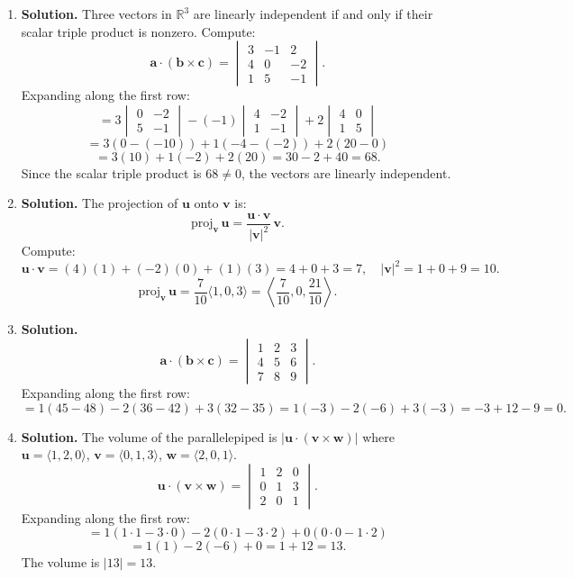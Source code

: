 \begin{enumerate}
\item \textbf{Solution.}
Three vectors in \( \mathbb{R}^3 \) are linearly independent if and only if their scalar triple product is nonzero. Compute:
\[
\mathbf{a} \cdot (\mathbf{b} \times \mathbf{c}) = \begin{vmatrix} 3 & -1 & 2 \\ 4 & 0 & -2 \\ 1 & 5 & -1 \end{vmatrix}.
\]
Expanding along the first row:
\[
= 3\begin{vmatrix} 0 & -2 \\ 5 & -1 \end{vmatrix} - (-1)\begin{vmatrix} 4 & -2 \\ 1 & -1 \end{vmatrix} + 2\begin{vmatrix} 4 & 0 \\ 1 & 5 \end{vmatrix}
\]
\[
= 3(0 - (-10)) + 1(-4 - (-2)) + 2(20 - 0)
\]
\[
= 3(10) + 1(-2) + 2(20) = 30 - 2 + 40 = 68.
\]
Since the scalar triple product is \( 68 \neq 0 \), the vectors are linearly independent.

\item \textbf{Solution.}
The projection of \( \mathbf{u} \) onto \( \mathbf{v} \) is:
\[
\text{proj}_{\mathbf{v}}\,\mathbf{u} = \frac{\mathbf{u} \cdot \mathbf{v}}{|\mathbf{v}|^2}\,\mathbf{v}.
\]
Compute:
\[
\mathbf{u} \cdot \mathbf{v} = (4)(1) + (-2)(0) + (1)(3) = 4 + 0 + 3 = 7, \quad |\mathbf{v}|^2 = 1 + 0 + 9 = 10.
\]
\[
\text{proj}_{\mathbf{v}}\,\mathbf{u} = \frac{7}{10}\langle 1, 0, 3 \rangle = \left\langle \frac{7}{10}, 0, \frac{21}{10} \right\rangle.
\]

\item \textbf{Solution.}
\[
\mathbf{a} \cdot (\mathbf{b} \times \mathbf{c}) = \begin{vmatrix} 1 & 2 & 3 \\ 4 & 5 & 6 \\ 7 & 8 & 9 \end{vmatrix}.
\]
Expanding along the first row:
\[
= 1(45 - 48) - 2(36 - 42) + 3(32 - 35) = 1(-3) - 2(-6) + 3(-3) = -3 + 12 - 9 = 0.
\]

\item \textbf{Solution.}
The volume of the parallelepiped is \( |\mathbf{u} \cdot (\mathbf{v} \times \mathbf{w})| \) where \( \mathbf{u} = \langle 1, 2, 0 \rangle \), \( \mathbf{v} = \langle 0, 1, 3 \rangle \), \( \mathbf{w} = \langle 2, 0, 1 \rangle \).
\[
\mathbf{u} \cdot (\mathbf{v} \times \mathbf{w}) = \begin{vmatrix} 1 & 2 & 0 \\ 0 & 1 & 3 \\ 2 & 0 & 1 \end{vmatrix}.
\]
Expanding along the first row:
\[
= 1(1 \cdot 1 - 3 \cdot 0) - 2(0 \cdot 1 - 3 \cdot 2) + 0(0 \cdot 0 - 1 \cdot 2)
\]
\[
= 1(1) - 2(-6) + 0 = 1 + 12 = 13.
\]
The volume is \( |13| = 13 \).


\end{enumerate}
